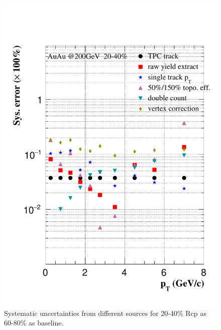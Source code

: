 \begin{figure}[htbp]
\begin{minipage}[htbp]{0.47\linewidth}
\centering
\includegraphics[width=1.0\textwidth,angle=0]{figure/Run14_D0HFT/sysErr_20_40_Rcp1.pdf}
\caption{ Systematic uncertainties from different sources for 20-40\% Rcp as 60-80\% as baseline. \label{sysErr_20_40_Rcp1}}
\end{minipage}
\hfill
\begin{minipage}[htbp]{0.47\linewidth}
\centering

\end{minipage}
\end{figure}
